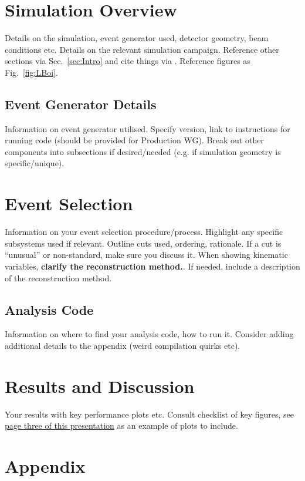 \documentclass[letterpaper,12pt]{article}
\begin{document}
\section{Simulation Overview}\label{sec:Sim_Overview}

Details on the simulation, event generator used, detector geometry, beam conditions etc. Details on the relevant simulation campaign. Reference other sections via Sec.~\ref{sec:Intro} and cite things via \cite{jr:2022_YR}. Reference figures as Fig.~\ref{fig:LBoi}.

\subsection{Event Generator Details}\label{subsec:EvGen}

Information on event generator utilised. Specify version, link to instructions for running code (should be provided for Production WG). Break out other components into subsections if desired/needed (e.g. if simulation geometry is specific/unique).

\section{Event Selection}\label{sec:EvSelect}

Information on your event selection procedure/process. Highlight any specific subsystems used if relevant. Outline cuts used, ordering, rationale. If a cut is ``unusual'' or non-standard, make sure you discuss it. When showing kinematic variables, \textbf{clarify the reconstruction method.}. If needed, include a description of the reconstruction method.

\subsection{Analysis Code}\label{subsec:Analysis_Code}

Information on where to find your analysis code, how to run it. Consider adding additional details to the appendix (weird compilation quirks etc).

\section{Results and Discussion}\label{sec:Results_Discuss}

Your results with key performance plots etc. Consult checklist of key figures, see \href{https://docs.google.com/presentation/d/1bqz9_GPvPoW4oz1m8KvzuUhPJZBe_CfU5APMt0LjfaU/edit?slide=id.g3338e3f4b69_0_51#slide=id.g3338e3f4b69_0_51}{page three of this presentation} as an example of plots to include.

\pagebreak
\appendix
\section{Appendix}


 

\end{document}
